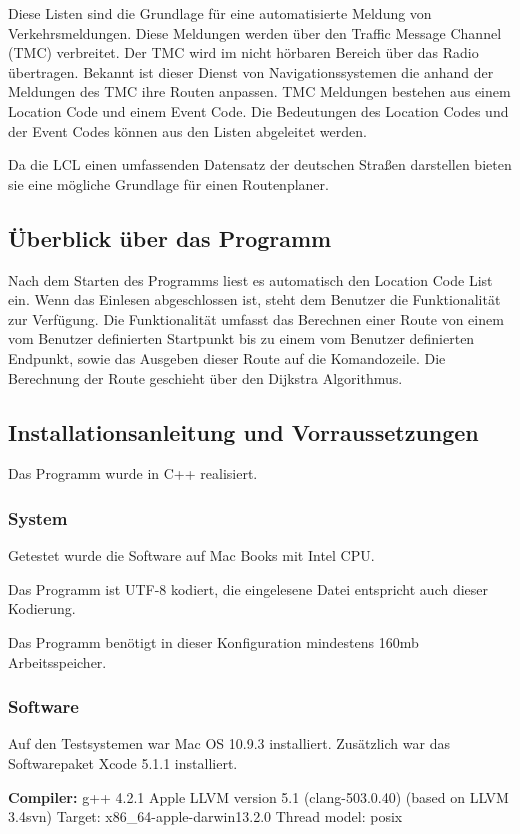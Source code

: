 \documentclass[12pt, a4paper, ngerman]{article}
\begin{document}
Diese Listen sind die Grundlage für eine automatisierte Meldung von Verkehrsmeldungen. Diese Meldungen werden über den Traffic Message Channel (TMC) verbreitet. Der TMC wird im nicht hörbaren Bereich über das Radio übertragen. Bekannt ist dieser Dienst von Navigationssystemen die anhand der Meldungen des TMC ihre Routen anpassen. TMC Meldungen bestehen aus einem Location Code und einem Event Code. Die Bedeutungen des Location Codes und der Event Codes können aus den Listen abgeleitet werden.

Da die LCL einen umfassenden Datensatz der deutschen Straßen darstellen bieten sie eine mögliche Grundlage für einen Routenplaner. 

\subsection{Überblick über das Programm}
Nach dem Starten des Programms liest es automatisch den Location Code List ein. Wenn das Einlesen abgeschlossen ist, steht dem Benutzer die Funktionalität zur Verfügung. Die Funktionalität umfasst das Berechnen einer Route von einem vom Benutzer definierten Startpunkt bis zu einem vom Benutzer definierten Endpunkt, sowie das Ausgeben dieser Route auf die Komandozeile. Die Berechnung der Route geschieht über den Dijkstra Algorithmus.

\subsection{Installationsanleitung und Vorraussetzungen}
Das Programm wurde in C++ realisiert. 
\subsubsection{System}
Getestet wurde die Software auf Mac Books mit Intel CPU.

Das Programm ist UTF-8 kodiert, die eingelesene Datei entspricht auch dieser Kodierung.

Das Programm benötigt in dieser Konfiguration mindestens 160mb Arbeitsspeicher.

\subsubsection{Software}
Auf den Testsystemen war Mac OS 10.9.3 installiert. Zusätzlich war das Softwarepaket Xcode 5.1.1 installiert. 

\textbf{Compiler:}\newline
 g++ 4.2.1  \newline
Apple LLVM version 5.1 (clang-503.0.40) (based on LLVM 3.4svn) \newline
Target: x86\_64-apple-darwin13.2.0 \newline
Thread model: posix
\end{document}
